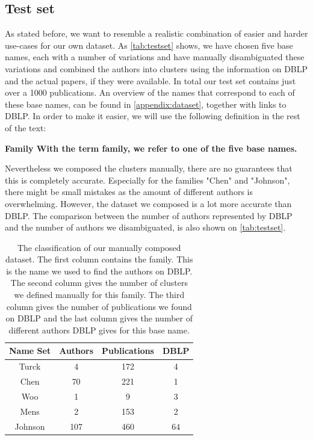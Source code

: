 \subsection{Test set}
\label{sec:testset}

As stated before, we want to resemble a realistic combination of easier and harder use-cases for our own dataset. As \autoref{tab:testset} shows, we have chosen five base names, each with a number of variations and have manually disambiguated these variations and combined the authors into clusters using the information on DBLP and the actual papers, if they were available. In total our test set contains just over a 1000 publications. An overview of the names that correspond to each of these base names, can be found in \autoref{appendix:dataset}, together with links to DBLP. In order to make it easier, we will use the following definition in the rest of the text:

\begin{mydef}
	\bfseries{Family} With the term family, we refer to one of the five base names.
\end{mydef}

Nevertheless we composed the clusters manually, there are no guarantees that this is completely accurate. Especially for the families "Chen" and "Johnson", there might be small mistakes as the amount of different authors is overwhelming. However, the dataset we composed is a lot more accurate than DBLP. The comparison between the number of authors represented by DBLP and the number of authors we disambiguated, is also shown on \autoref{tab:testset}.

\begin{table}
	\centering
		\begin{tabular}[ht]{|c|c|c|c|}
			\hline
			\bfseries{Name Set} & \bfseries{Authors} & \bfseries{Publications} & \bfseries{DBLP} \\
			\hline
			Turck & 4 & 172 & 4 \\
			\hline
			Chen & 70 & 221 & 1 \\
			\hline
			Woo & 1 & 9 & 3 \\
			\hline
			Mens & 2 & 153 & 2 \\
			\hline
			Johnson & 107 & 460 & 64 \\
			\hline
		\end{tabular}
	\caption{The classification of our manually composed dataset. The first column contains the family. This is the name we used to find the authors on DBLP. The second column gives the number of clusters we defined manually for this family. The third column gives the number of publications we found on DBLP and the last column gives the number of different authors DBLP gives for this base name.}
	\label{tab:testset}
\end{table}

